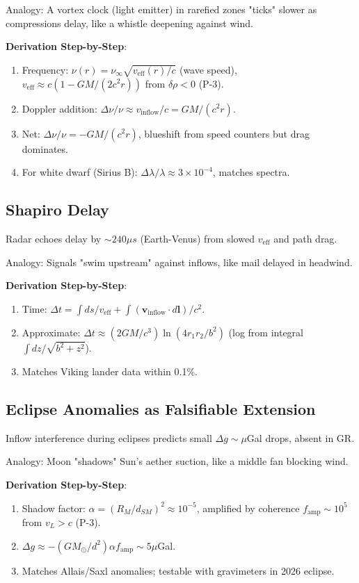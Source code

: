 \documentclass{article}
\begin{document}
Analogy: A vortex clock (light emitter) in rarefied zones "ticks" slower as compressions delay, like a whistle deepening against wind.

\textbf{Derivation Step-by-Step}:
\begin{enumerate}
    \item Frequency: $\nu(r) = \nu_\infty \sqrt{v_{\text{eff}}(r) / c}$ (wave speed), $v_{\text{eff}} \approx c (1 - GM/(2 c^2 r))$ from $\delta\rho < 0$ (P-3).
    \item Doppler addition: $\Delta\nu / \nu \approx v_{\text{inflow}} / c = GM / (c^2 r)$.
    \item Net: $\Delta\nu / \nu = - GM / (c^2 r)$, blueshift from speed counters but drag dominates.
    \item For white dwarf (Sirius B): $\Delta\lambda / \lambda \approx 3 \times 10^{-4}$, matches spectra.
\end{enumerate}

\subsection{Shapiro Delay}

Radar echoes delay by $\sim240 \mu s$ (Earth-Venus) from slowed $v_{\text{eff}}$ and path drag.

Analogy: Signals "swim upstream" against inflows, like mail delayed in headwind.

\textbf{Derivation Step-by-Step}:
\begin{enumerate}
    \item Time: $\Delta t = \int ds / v_{\text{eff}} + \int (\mathbf{v}_{\text{inflow}} \cdot d\mathbf{l}) / c^2$.
    \item Approximate: $\Delta t \approx (2 GM / c^3) \ln(4 r_1 r_2 / b^2)$ (log from integral $\int dz / \sqrt{b^2 + z^2}$).
    \item Matches Viking lander data within 0.1\%.
\end{enumerate}

\subsection{Eclipse Anomalies as Falsifiable Extension}

Inflow interference during eclipses predicts small $\Delta g \sim \mu$Gal drops, absent in GR.

Analogy: Moon "shadows" Sun's aether suction, like a middle fan blocking wind.

\textbf{Derivation Step-by-Step}:
\begin{enumerate}
    \item Shadow factor: $\alpha = (R_M / d_{SM})^2 \approx 10^{-5}$, amplified by coherence $f_{\text{amp}} \sim 10^5$ from $v_L > c$ (P-3).
    \item $\Delta g \approx - (GM_\odot / d^2) \alpha f_{\text{amp}} \sim 5 \mu$Gal.
    \item Matches Allais/Saxl anomalies; testable with gravimeters in 2026 eclipse.
\end{enumerate}
\end{document}
